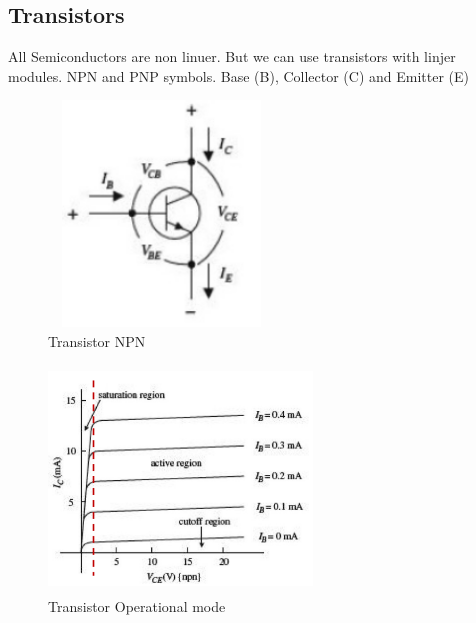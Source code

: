 \newpage
\subsection{Transistors}
All Semiconductors are non linuer. But we can use transistors with linjer modules. \newline
NPN and PNP symbols. Base (B), Collector (C) and Emitter (E)
\begin{figure}[h]
    \vspace{10mm}
    \centering
    \includegraphics[width=6cm, height=6cm]{image/transistor-NPN.png}
    \caption{Transistor NPN}
\end{figure}

\begin{figure}[h]
    \vspace{10mm}
    \centering
    \includegraphics[width=7cm, height=6cm]{image/transistor_operation-mode.png}
    \caption{Transistor Operational mode}
\end{figure}


